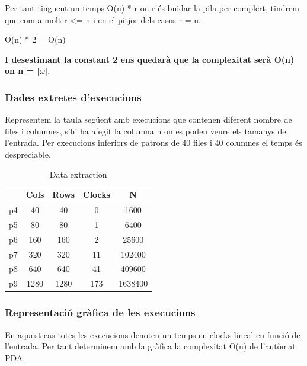 \documentclass[12pt,a4paper]{report}
\def \w{$\omega$}
\begin{document}
Per tant tinguent un temps O(n) * r on r és buidar la pila per complert, tindrem que com a molt r <= n i en el pitjor dels casos r = n. 

\begin{center}
O(n) * 2 = O(n) 
\end{center}

\textbf{I desestimant la constant 2 ens quedarà que la complexitat serà O(n) on  n = |\w{}|}.

\subsubsection{Dades extretes d'execucions}

Representem la taula següent amb execucions que contenen diferent nombre de files i columnes, s'hi ha afegit la columna n on es poden veure els tamanys de l'entrada. Per execucions inferiors de patrons de 40 files i 40 columnes el temps és despreciable. 

\begin{center}

\begin{table}[ht]
\caption{\label{tab:table-name} Data extraction}
\centering
\begin{tabular}{ccccc}
\hline
\hline
   & Cols & Rows & Clocks & N       \\ \hline
p4 & 40   & 40   & 0      & 1600    \\ \hline
p5 & 80   & 80   & 1      & 6400    \\ \hline
p6 & 160  & 160  & 2      & 25600   \\ \hline
p7 & 320  & 320  & 11     & 102400  \\ \hline
p8 & 640  & 640  & 41     & 409600  \\ \hline
p9 & 1280 & 1280 & 173    & 1638400 \\ \hline
\end{tabular}
\end{table}

\end{center}

\subsubsection{Representació gràfica de les execucions}

En aquest cas totes les execucions denoten un temps en clocks lineal en funció de l'entrada. Per tant determinem amb la gràfica la complexitat O(n) de l'autòmat PDA.
\end{document}
